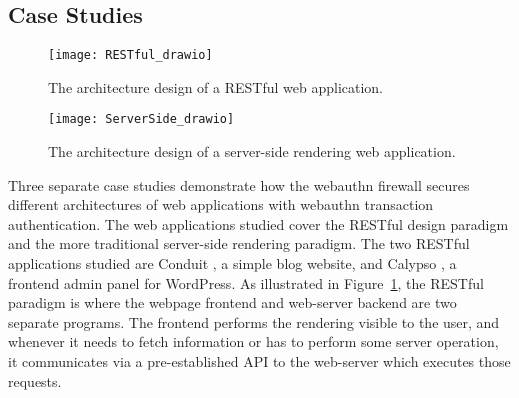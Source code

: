 
\subsection{Case Studies}

\begin{figure}[h]
  \centering
  \texttt{[image: RESTful\_drawio]}
  \caption{The architecture design of a RESTful web application.}
  \label{Fig:CaseStudiesRESTful}
\end{figure}

\begin{figure}[h]
  \centering
  \texttt{[image: ServerSide\_drawio]}
  \caption{The architecture design of a server-side rendering web application.}
  \label{Fig:CaseStudiesServerSide}
\end{figure}

Three separate case studies demonstrate how the webauthn firewall secures different architectures of web applications with webauthn transaction authentication. The web applications studied cover the RESTful design paradigm and the more traditional server-side rendering paradigm. The two RESTful applications studied are Conduit \cite{TODO-conduit}, a simple blog website, and Calypso \cite{TODO-calypso}, a frontend admin panel for WordPress. As illustrated in Figure~\ref{Fig:CaseStudiesRESTful}, the RESTful paradigm is where the webpage frontend and web-server backend are two separate programs. The frontend performs the rendering visible to the user, and whenever it needs to fetch information or has to perform some server operation, it communicates via a pre-established API to the web-server which executes those requests. 

